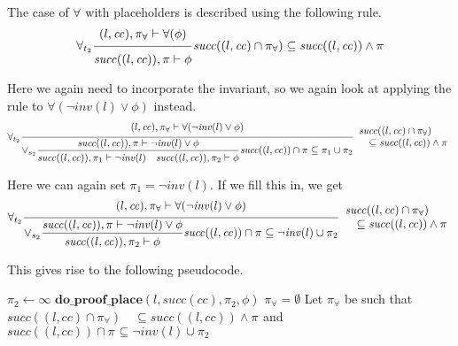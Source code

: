 \documentclass{article}
\newcommand{\proofrule}[3][]{#1 \frac{\raisebox{.7ex}{\normalsize{$#2$}}}
  {\raisebox{-1.0ex}{\normalsize{$#3$}}}}
\newcommand{\placeholder}[1][]{\pi_{#1}}
\newcommand{\loc}{l}
\newcommand{\region}{\mathit{cc}}
\newcommand{\suc}{\mathit{succ}}
\newcommand{\inv}{\mathit{inv}}
\newcommand{\method}[1]{\ensuremath{\mathbf{#1}}}
\begin{document}
The case of $\forall$ with placeholders is described using the following rule.
\[
\proofrule[\forall_{t_2}]
{(\loc, \region), \placeholder[\forall] \vdash \forall(\phi)}
{\suc((\loc, \region)), \placeholder \vdash \phi}
\suc((\loc, \region) \cap \placeholder[\forall]) \subseteq \suc((\loc, \region)) \land \placeholder
\]

Here we again need to incorporate the invariant, so we again look at applying the rule
to $\forall(\lnot \inv(\loc) \lor \phi)$ instead.
\[
\proofrule[\forall_{t_2}]
{(\loc, \region), \placeholder[\forall] \vdash \forall(\lnot \inv(\loc) \lor \phi)}
{
  \proofrule[\lor_{s_2}]
  {\suc((\loc, \region)), \placeholder \vdash \lnot \inv(\loc) \lor  \phi}
  {\suc((\loc, \region)), \placeholder[1] \vdash \lnot \inv(\loc)
    \quad \suc((\loc, \region)), \placeholder[2] \vdash \phi}
    \suc((\loc, \region)) \cap \placeholder \subseteq \placeholder[1] \cup \placeholder[2]
}
\begin{array}{l}
\suc((\loc, \region) \cap \placeholder[\forall])\\
\quad \subseteq \suc((\loc, \region)) \land \placeholder
\end{array}
\]

Here we can again set $\placeholder[1] = \lnot \inv(\loc)$. If we fill this in, we get
\[
\proofrule[\forall_{t_2}]
{(\loc, \region), \placeholder[\forall] \vdash \forall(\lnot \inv(\loc) \lor \phi)}
{
  \proofrule[\lor_{s_2}]
  {\suc((\loc, \region)), \placeholder \vdash \lnot \inv(\loc) \lor  \phi}
  {\suc((\loc, \region)), \placeholder[2] \vdash \phi}
    \suc((\loc, \region)) \cap \placeholder \subseteq \lnot \inv(\loc) \cup \placeholder[2]
}
\begin{array}{l}
\suc((\loc, \region) \cap \placeholder[\forall])\\
\quad \subseteq \suc((\loc, \region)) \land \placeholder
\end{array}
\]

This gives rise to the following pseudocode.
\begin{algorithm}[H]
\caption{$\method{do\_proof\_place\_forall}(\loc, \region, \placeholder[\forall], \forall(\phi))$}
\begin{algorithmic}
\STATE $\placeholder[2] \gets \infty$
\STATE $\method{do\_proof\_place}(\loc, \suc(\region), \placeholder[2], \phi)$
\IF{$\placeholder[2] = \emptyset$}
  \STATE $\placeholder[\forall] = \emptyset$
\ELSE
  \STATE Let $\placeholder[\forall]$ be such that 
  $\suc((\loc, \region) \cap \placeholder[\forall]) \quad \subseteq \suc((\loc, \region)) \land \placeholder$
  and $\suc((\loc, \region)) \cap \placeholder \subseteq \lnot \inv(\loc) \cup \placeholder[2]$
\ENDIF
\end{algorithmic}
\end{algorithm}
\end{document}
